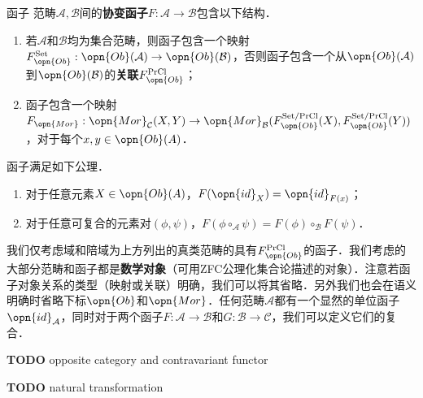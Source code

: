 \begin{definition}{函子}
范畴$\mathcal{A},\mathcal{B}$间的\textbf{协变函子}$F:\mathcal{A}\to\mathcal{B}$包含以下结构．
\begin{enumerate}
    \item 若$\mathcal{A}$和$\mathcal{B}$均为集合范畴，则函子包含一个映射$F_{\opn{Ob}}^{\text{Set}}:\opn{Ob}(\mathcal{A})\to\opn{Ob}(\mathcal{B})$，否则函子包含一个从$\opn{Ob}(\mathcal{A})$到$\opn{Ob}(\mathcal{B})$的\textbf{关联}$F_{\opn{Ob}}^{\text{PrCl}}$；
    \item 函子包含一个映射$F_{\opn{Mor}}:\opn{Mor}_\mathcal{C}(X,Y)\to\opn{Mor}_\mathcal{B}(F_{\opn{Ob}}^{\text{Set/PrCl}}(X),F_{\opn{Ob}}^{\text{Set/PrCl}}(Y))$，对于每个$x,y\in\opn{Ob}(A)$．
\end{enumerate}
函子满足如下公理．
\begin{enumerate}
    \item 对于任意元素$X\in\opn{Ob}(A)$，$F(\opn{id}_X)=\opn{id}_{F(x)}$；
    \item 对于任意可复合的元素对$(\phi,\psi)$，$F(\phi\circ_\mathcal{A}\psi)=F(\phi)\circ_\mathcal{B}F(\psi)$．
\end{enumerate}
\end{definition}
我们仅考虑域和陪域为上方列出的真类范畴的具有$F_{\opn{Ob}}^{\text{PrCl}}$的函子．我们考虑的大部分范畴和函子都是\textbf{数学对象}（可用ZFC公理化集合论描述的对象）．注意若函子对象关系的类型（映射或关联）明确，我们可以将其省略．另外我们也会在语义明确时省略下标$\opn{Ob}$和$\opn{Mor}$．任何范畴$\mathcal{A}$都有一个显然的单位函子$\opn{id}_\mathcal{A}$，同时对于两个函子$F:\mathcal{A}\to\mathcal{B}$和$G:\mathcal{B}\to\mathcal{C}$，我们可以定义它们的复合．

\textbf{TODO} opposite category and contravariant functor

\textbf{TODO} natural transformation

